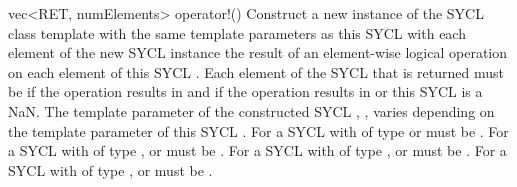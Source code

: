   \addRow
  {vec<RET, numElements> operator!()}
  {
    Construct a new instance of the SYCL  class template with the same template parameters as this SYCL  with each element of the new SYCL  instance the result of an element-wise  logical operation on each element of this SYCL . Each element of the SYCL  that is returned must be  if the operation results in  and  if the operation results in  or this SYCL  is a NaN.
      \newline \newline
      The  template parameter of the constructed SYCL , , varies depending on the  template parameter of this SYCL . For a SYCL  with  of type  or   must be . For a SYCL  with  of type ,  or   must be . For a SYCL  with  of type ,  or   must be . For a SYCL  with  of type ,  or   must be .
  }
\completeTable

